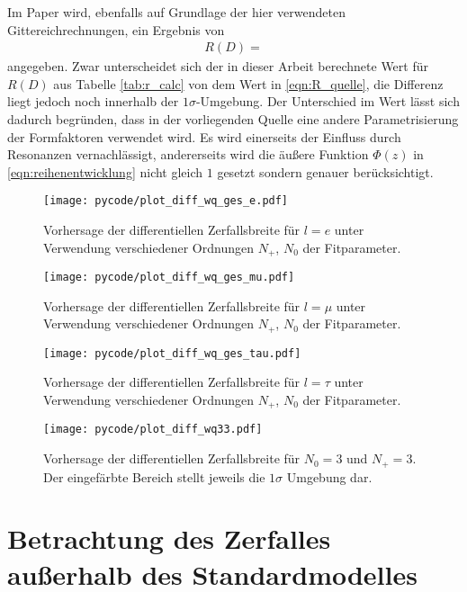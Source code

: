 Im Paper \cite{PhysRevD.92.034506} wird, ebenfalls auf Grundlage der hier verwendeten Gittereichrechnungen, ein Ergebnis von
\begin{align}
  \label{eqn:R_quelle}
  R(D) = 
\end{align}
angegeben.
Zwar unterscheidet sich der in dieser Arbeit berechnete Wert für $R(D)$ aus Tabelle \ref{tab:r_calc} von dem Wert in \eqref{eqn:R_quelle}, die Differenz liegt jedoch noch innerhalb der $\num{1}\sigma$-Umgebung.
Der Unterschied im Wert lässt sich dadurch begründen, dass in der vorliegenden Quelle eine andere Parametrisierung der Formfaktoren verwendet wird.
Es wird einerseits der Einfluss durch Resonanzen vernachlässigt, andererseits wird die äußere Funktion $\Phi(z)$ in \eqref{eqn:reihenentwicklung} nicht gleich $1$ gesetzt sondern genauer berücksichtigt.

\begin{figure}
  \centering
  \texttt{[image: pycode/plot\_diff\_wq\_ges\_e.pdf]}
  \caption{Vorhersage der differentiellen Zerfallsbreite für $l=e$ unter Verwendung verschiedener Ordnungen $N_+$, $N_0$ der Fitparameter.}
  \label{fig:difwqe}
\end{figure}
\begin{figure}
  \centering
  \texttt{[image: pycode/plot\_diff\_wq\_ges\_mu.pdf]}
  \caption{Vorhersage der differentiellen Zerfallsbreite für $l=\mu$ unter Verwendung verschiedener Ordnungen $N_+$, $N_0$ der Fitparameter.}
  \label{fig:difwqmu}
\end{figure}
\begin{figure}
  \centering
  \texttt{[image: pycode/plot\_diff\_wq\_ges\_tau.pdf]}
  \caption{Vorhersage der differentiellen Zerfallsbreite für $l=\tau$ unter Verwendung verschiedener Ordnungen $N_+$, $N_0$ der Fitparameter.}
  \label{fig:difwqtau}
\end{figure}
\begin{figure}
  \centering
  \texttt{[image: pycode/plot\_diff\_wq33.pdf]}
  \caption{Vorhersage der differentiellen Zerfallsbreite für $N_0 = \num{3}$ und $N_+ = \num{3}$. Der eingefärbte Bereich stellt jeweils die $\num{1}\sigma$ Umgebung dar.}
  \label{fig:difwq33}
\end{figure}

\section{Betrachtung des Zerfalles außerhalb des Standardmodelles}

